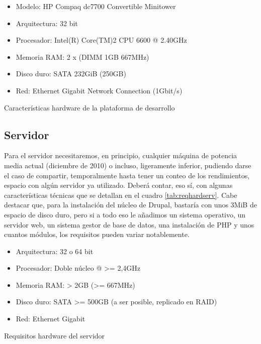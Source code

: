 \begin{table}[h]
  \begin{center}
    \begin{itemize}
     \item Modelo: HP Compaq dc7700 Convertible Minitower
     \item Arquitectura: 32 bit
     \item Procesador: Intel(R) Core(TM)2 CPU 6600 @ 2.40GHz
     \item Memoria RAM: 2 x (DIMM 1GB 667MHz)
     \item Disco duro: SATA 232GiB (250GB) 
     \item Red: Ethernet Gigabit Network Connection (1Gbit/s)
    \end{itemize}
  \end{center}
  \caption{Características hardware de la plataforma de desarrollo}
  \label{tab:workstation}
\end{table}




\subsection{Servidor}

\par Para el servidor necesitaremos, en principio, cualquier máquina de potencia media actual (diciembre de 2010) o incluso, ligeramente inferior, pudiendo darse el caso de compartir, temporalmente hasta tener un conteo de los rendimientos, espacio con algún servidor ya utilizado.
Deberá contar, eso sí, con algunas características técnicas que se detallan en el cuadro \ref{tab:reqhardserv}. Cabe destacar que, para la instalación del núcleo de Drupal, bastaría con unos 3MiB de espacio de disco duro, pero si a todo eso le añadimos un sistema operativo, un servidor web, un sistema gestor de base de datos, una instalación de PHP y unos cuantos módulos, los requisitos pueden variar notablemente.

\begin{table}[h]
  \begin{center}
    \begin{itemize}
     \item Arquitectura: 32 o 64 bit
     \item Procesador: Doble núcleo @ >= 2,4GHz
     \item Memoria RAM: > 2GB (>= 667MHz)
     \item Disco duro: SATA >= 500GB (a ser posible, replicado en RAID)
     \item Red: Ethernet Gigabit
    \end{itemize}
  \end{center}
  \caption{Requisitos hardware del servidor}
  \label{tab:reqhardserv}
\end{table}


